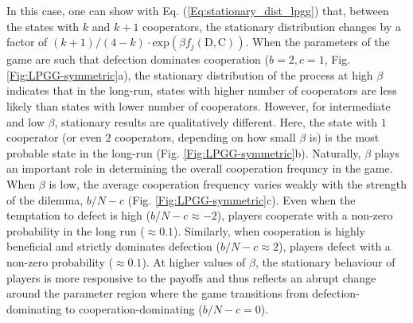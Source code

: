 \documentclass[11pt]{article}
\theoremstyle{plainCl1}
\theoremstyle{plainCl2}
\newcommand{\C}{\mathrm{C}}
\newcommand{\D}{\mathrm{D}}
\begin{document}
In this case, one can show with Eq. (\ref{Eq:stationary_dist_lpgg}) that, between the states with $k$ and $k+1$ cooperators, the stationary distribution changes by a factor of $(k+1)/(4-k) \cdot \mathrm{exp}(\beta f_j(\D,\C))$. When the parameters of the game are such that defection dominates cooperation ($b = 2, c = 1$, Fig. \ref{Fig:LPGG-symmetric}a), the stationary distribution of the process at high $\beta$ indicates that in the long-run, states with higher number of cooperators are less likely than states with lower number of cooperators. However, for intermediate and low $\beta$, stationary results are qualitatively different. Here, the state with $1$ cooperator (or even $2$ cooperators, depending on how small $\beta$ is) is the most probable state in the long-run (Fig. \ref{Fig:LPGG-symmetric}b).  Naturally, $\beta$ plays an important role in determining the overall cooperation frequncy in the game. When $\beta$ is low, the average cooperation frequency varies weakly with the strength of the dilemma, $b/N - c$ (Fig. \ref{Fig:LPGG-symmetric}c). Even when the temptation to defect is high ($b/N - c \approx -2$), players cooperate with a non-zero probability in the long run ($\approx 0.1$). Similarly, when cooperation is highly beneficial and strictly dominates defection ($b/N - c \approx 2$), players defect with a non-zero probability ($\approx 0.1$). At higher values of $\beta$, the stationary behaviour of players is more responsive to the payoffs and thus reflects an abrupt change around the parameter region where the game transitions from defection-dominating to cooperation-dominating ($b/N - c = 0$).  \\ \\
\noindent 
\end{document}
